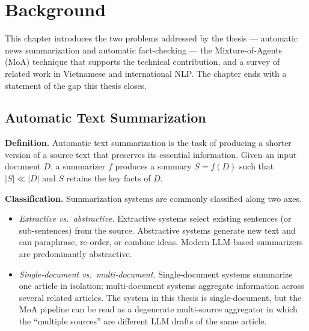 \chapter{Background}

This chapter introduces the two problems addressed by the thesis ---
automatic news summarization and automatic fact-checking --- the
Mixture-of-Agents (MoA) technique that supports the technical contribution,
and a survey of related work in Vietnamese and international NLP. The chapter
ends with a statement of the gap this thesis closes.

\section{Automatic Text Summarization}

\textbf{Definition.}
Automatic text summarization is the task of producing a shorter version of a
source text that preserves its essential information. Given an input document
$D$, a summarizer $f$ produces a summary $S = f(D)$ such that $|S| \ll |D|$
and $S$ retains the key facts of $D$.

\textbf{Classification.}
Summarization systems are commonly classified along two axes.

\begin{itemize}
  \item \textit{Extractive vs.\ abstractive.}
        Extractive systems select existing sentences (or sub-sentences) from
        the source. Abstractive systems generate new text and can paraphrase,
        re-order, or combine ideas. Modern LLM-based summarizers are
        predominantly abstractive.
  \item \textit{Single-document vs.\ multi-document.}
        Single-document systems summarize one article in isolation;
        multi-document systems aggregate information across several related
        articles. The system in this thesis is single-document, but the MoA
        pipeline can be read as a degenerate multi-source aggregator in
        which the ``multiple sources'' are different LLM drafts of the same
        article.
\end{itemize}

